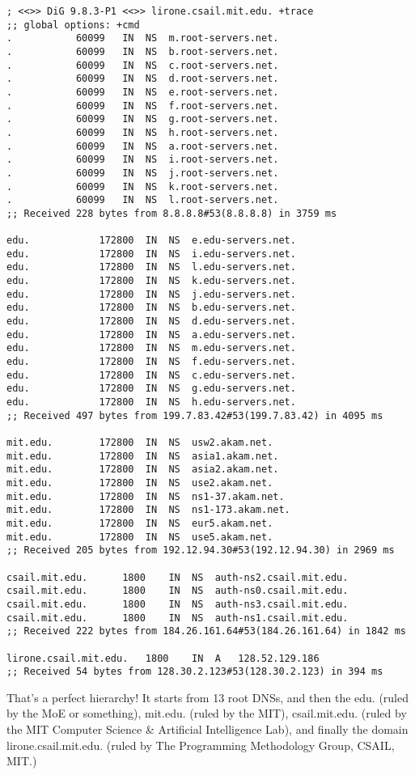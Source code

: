 \documentclass{article}
\begin{document}
\begin{lstlisting}[numberstyle=\tiny\monaco,
        basicstyle=\small\monaco]
; <<>> DiG 9.8.3-P1 <<>> lirone.csail.mit.edu. +trace
;; global options: +cmd
.			60099	IN	NS	m.root-servers.net.
.			60099	IN	NS	b.root-servers.net.
.			60099	IN	NS	c.root-servers.net.
.			60099	IN	NS	d.root-servers.net.
.			60099	IN	NS	e.root-servers.net.
.			60099	IN	NS	f.root-servers.net.
.			60099	IN	NS	g.root-servers.net.
.			60099	IN	NS	h.root-servers.net.
.			60099	IN	NS	a.root-servers.net.
.			60099	IN	NS	i.root-servers.net.
.			60099	IN	NS	j.root-servers.net.
.			60099	IN	NS	k.root-servers.net.
.			60099	IN	NS	l.root-servers.net.
;; Received 228 bytes from 8.8.8.8#53(8.8.8.8) in 3759 ms

edu.			172800	IN	NS	e.edu-servers.net.
edu.			172800	IN	NS	i.edu-servers.net.
edu.			172800	IN	NS	l.edu-servers.net.
edu.			172800	IN	NS	k.edu-servers.net.
edu.			172800	IN	NS	j.edu-servers.net.
edu.			172800	IN	NS	b.edu-servers.net.
edu.			172800	IN	NS	d.edu-servers.net.
edu.			172800	IN	NS	a.edu-servers.net.
edu.			172800	IN	NS	m.edu-servers.net.
edu.			172800	IN	NS	f.edu-servers.net.
edu.			172800	IN	NS	c.edu-servers.net.
edu.			172800	IN	NS	g.edu-servers.net.
edu.			172800	IN	NS	h.edu-servers.net.
;; Received 497 bytes from 199.7.83.42#53(199.7.83.42) in 4095 ms

mit.edu.		172800	IN	NS	usw2.akam.net.
mit.edu.		172800	IN	NS	asia1.akam.net.
mit.edu.		172800	IN	NS	asia2.akam.net.
mit.edu.		172800	IN	NS	use2.akam.net.
mit.edu.		172800	IN	NS	ns1-37.akam.net.
mit.edu.		172800	IN	NS	ns1-173.akam.net.
mit.edu.		172800	IN	NS	eur5.akam.net.
mit.edu.		172800	IN	NS	use5.akam.net.
;; Received 205 bytes from 192.12.94.30#53(192.12.94.30) in 2969 ms

csail.mit.edu.		1800	IN	NS	auth-ns2.csail.mit.edu.
csail.mit.edu.		1800	IN	NS	auth-ns0.csail.mit.edu.
csail.mit.edu.		1800	IN	NS	auth-ns3.csail.mit.edu.
csail.mit.edu.		1800	IN	NS	auth-ns1.csail.mit.edu.
;; Received 222 bytes from 184.26.161.64#53(184.26.161.64) in 1842 ms

lirone.csail.mit.edu.	1800	IN	A	128.52.129.186
;; Received 54 bytes from 128.30.2.123#53(128.30.2.123) in 394 ms
\end{lstlisting}

That's a perfect hierarchy! It starts from 13 root DNSs, and then the edu. (ruled by the MoE or something), mit.edu. (ruled by the MIT), csail.mit.edu. (ruled by the MIT Computer Science \& Artificial Intelligence Lab), and finally the domain lirone.csail.mit.edu. (ruled by The Programming Methodology Group, CSAIL, MIT.)
\end{document}
